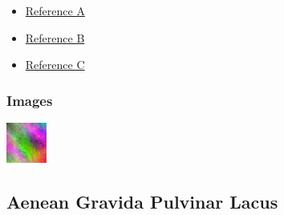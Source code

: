 \documentclass[a4paper]{article}
\def\tightlist{}
\begin{document}
      \begin{itemize}
\tightlist
\item
  \href{https://example.com/}{Reference A}
\item
  \href{https://example.com/}{Reference B}
\item
  \href{https://example.com/}{Reference C}
\end{itemize}

    
          \subsubsection{Images}
      
              \begin{minipage}[c]{\textwidth}
          \centering
          \includegraphics[width=\textwidth]{report/issues/issue.png}
          \label{issue.md:issue.png}
          \vspace{4ex}
        \end{minipage}
          
    \clearpage

      \newpage
    
    \subsection{Aenean Gravida Pulvinar Lacus}
    \label{issue2.md}
\end{document}
